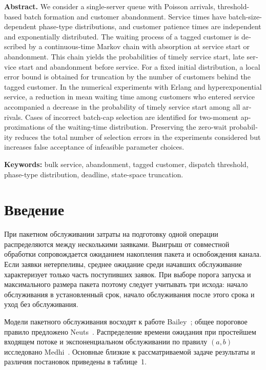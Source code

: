 \begin{otherlanguage}{english}
\noindent\textbf{Abstract.}
We consider a single-server queue with Poisson arrivals, threshold-based batch formation and customer abandonment. Service times have batch-size-dependent phase-type distributions, and customer patience times are independent and exponentially distributed. The waiting process of a tagged customer is described by a continuous-time Markov chain with absorption at service start or abandonment. This chain yields the probabilities of timely service start, late service start and abandonment before service. For a fixed initial distribution, a local error bound is obtained for truncation by the number of customers behind the tagged customer. In the numerical experiments with Erlang and hyperexponential service, a reduction in mean waiting time among customers who entered service accompanied a decrease in the probability of timely service start among all arrivals. Cases of incorrect batch-cap selection are identified for two-moment approximations of the waiting-time distribution. Preserving the zero-wait probability reduces the total number of selection errors in the experiments considered but increases false acceptance of infeasible parameter choices.

\medskip
\noindent\textbf{Keywords:} bulk service, abandonment, tagged customer, dispatch threshold, phase-type distribution, deadline, state-space truncation.
\end{otherlanguage}

\section*{Введение}

При пакетном обслуживании затраты на подготовку одной операции распределяются между несколькими заявками. Выигрыш от совместной обработки сопровождается ожиданием накопления пакета и освобождения канала. Если заявки нетерпеливы, среднее ожидание среди начавших обслуживание характеризует только часть поступивших заявок. При выборе порога запуска и максимального размера пакета поэтому следует учитывать три исхода: начало обслуживания в установленный срок, начало обслуживания после этого срока и уход без обслуживания.

Модели пакетного обслуживания восходят к работе Bailey~\cite{bailey1954}; общее пороговое правило предложено Neuts~\cite{neuts1967}. Распределение времени ожидания при простейшем входящем потоке и экспоненциальном обслуживании по правилу $(a,b)$ исследовано Medhi~\cite{medhi1975}. Основные близкие к рассматриваемой задаче результаты и различия постановок приведены в таблице~1.

